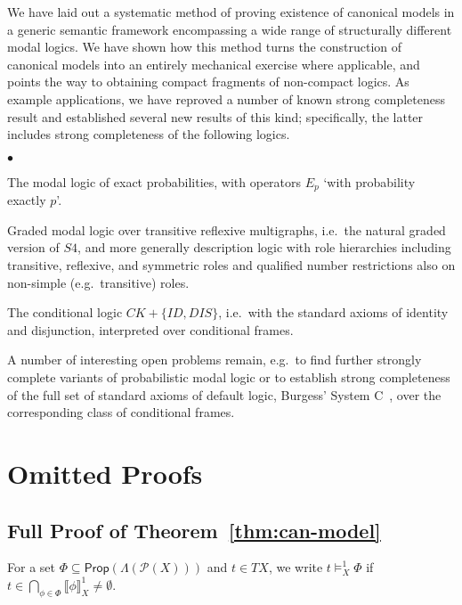 \documentclass[proceedings]{stacs}
\theoremstyle{definition}
\theoremstyle{plain}
\newcommand{\mi}[1]{\mathit{#1}}
\newcommand{\Pow}{\mathcal{P}}
\newcommand{\Prop}{\mathsf{Prop}}
\newcommand{\lsem}{\llbracket}
\newcommand{\rsem}{\rrbracket}
\newenvironment{sparitemize}
{\begin{list}{$\bullet$}{
    \setlength{\leftmargin}{0pt}
    \setlength{\parsep}{0pt}
    \setlength{\itemindent}{4ex}
    \setlength{\itemsep}{0pt}
  }
}{\end{list}}
\begin{document}
\noindent We have laid out a systematic method of proving existence of
canonical models in a generic semantic framework encompassing a wide
range of structurally different modal logics. We have shown how this
method turns the construction of canonical models into an entirely
mechanical exercise where applicable, and points the way to obtaining
compact fragments of non-compact logics. As example applications, we
have reproved a number of known strong completeness result and
established several new results of this kind; specifically, the latter
includes strong completeness of the following logics.
\begin{sparitemize}
\item The modal logic of exact probabilities, with operators $E_p$
  `with probability exactly $p$'.
\item Graded modal logic over transitive reflexive multigraphs, i.e.\
  the natural graded version of $S4$, and more generally description
  logic with role hierarchies including transitive, reflexive, and
  symmetric roles and qualified number restrictions also on non-simple
  (e.g.\ transitive) roles.
\item The conditional logic $CK+\{\mi{ID},\mi{DIS}\}$, i.e.\ with the
  standard axioms of identity and disjunction, interpreted over
  conditional frames.
\end{sparitemize}
A number of interesting open problems remain, e.g.\ to find further
strongly complete variants of probabilistic modal logic or to
establish strong completeness of the full set of standard axioms of
default logic, Burgess' System C~\cite{Burgess81}, over the
corresponding class of conditional frames.



\iffalse
\newpage\appendix
\section{Omitted Proofs}


\subsection*{Full Proof of Theorem~\ref{thm:can-model}}

\noindent For a set $\Phi \subseteq \Prop(\Lambda(\Pow(X)))$ and $t\in
TX$, we write $t \models^1_X \Phi$ if $t\in\bigcap_{\phi \in \Phi}
\lsem \phi \rsem_X^1 \neq \emptyset$.
\end{document}
